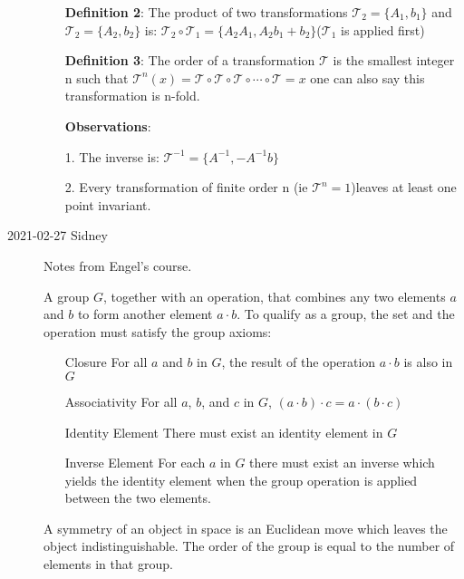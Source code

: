 \begin{description}
\begin{itemize}
\textbf{Definition 2}: The product of two transformations $\mathcal{T}_2=\lbrace A_1,b_1\rbrace$ and $\mathcal{T}_2=\lbrace A_2,b_2\rbrace$ is: $\mathcal{T}_2\circ\mathcal{T}_1=\lbrace A_2A_1,A_2b_1+b_2\rbrace$($\mathcal{T}_1$ is applied first)

\textbf{Definition 3}: The order of a transformation $\mathcal{T}$ is the smallest integer n such that $\mathcal{T}^n(x)=\mathcal{T}\circ\mathcal{T}\circ\mathcal{T}\circ\cdots\circ\mathcal{T}=x$ one can also say this transformation is n-fold.

\textbf{Observations}:
\item[1.] The inverse is: $\mathcal{T}^{-1}=\lbrace A^{-1},-A^{-1}b\rbrace$
\item[2.] Every transformation of finite order n (ie $\mathcal{T}^n=1$)leaves at least one point invariant.
\end{itemize}


\item[2021-02-27 Sidney] Notes from Engel's course.

\vspace{3mm}

A group $G$, together with an operation, that combines any two elements $a$ and $b$ to form another element $a\cdot b$. To qualify as a group, the set and the operation must satisfy the group axioms:
\begin{itemize}
\item[Closure]
For all $a$ and $b$ in $G$, the result of the operation $a\cdot b$ is also in $G$

\item[Associativity]
For all $a$, $b$, and $c$ in $G$, $(a\cdot b)\cdot c=a\cdot (b\cdot c)$

\item[Identity Element]
There must exist an identity element in $G$

\item[Inverse Element]
For each $a$ in $G$ there must exist an inverse which yields the identity element when the group operation is applied between the two elements.
\end{itemize}

A symmetry of an object in space is an Euclidean move which leaves the object indistinguishable. The order of the group is equal to the number of elements in that group.

%


\end{description}
